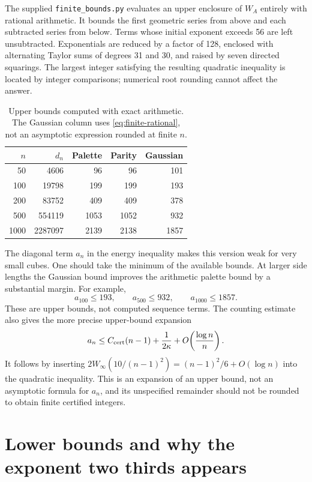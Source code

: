 \documentclass[11pt,letterpaper]{article}
\theoremstyle{definition}
\newcommand{\code}[1]{\texttt{#1}}
\begin{document}
The supplied \code{finite\_bounds.py} evaluates an upper enclosure of
\(W_A\) entirely with rational arithmetic. It bounds the first geometric
series from above and each subtracted series from below. Terms whose
initial exponent exceeds 56 are left unsubtracted. Exponentials are
reduced by a factor of 128, enclosed with alternating Taylor sums of
degrees 31 and 30, and raised by seven directed squarings. The largest
integer satisfying the resulting quadratic inequality is located by
integer comparisons; numerical root rounding cannot affect the answer.

\begin{table}[ht]
\centering
\caption{Upper bounds computed with exact arithmetic. The Gaussian column
uses \cref{eq:finite-rational}, not an asymptotic expression rounded at
finite \(n\).}
\label{tab:large-upper}
\begin{tabular}{rrrrr}
\toprule
\(n\)&\(d_n\)&Palette&Parity&Gaussian\\
\midrule
50&4606&96&96&101\\
100&19798&199&199&193\\
200&83752&409&409&378\\
500&554119&1053&1052&932\\
1000&2287097&2139&2138&1857\\
\bottomrule
\end{tabular}
\end{table}

The diagonal term \(a_n\) in the energy inequality makes this version
weak for very small cubes. One should take the minimum of the available
bounds. At larger side lengths the Gaussian bound improves the
arithmetic palette bound by a substantial margin. For example,
\[
 a_{100}\le193,\qquad a_{500}\le932,\qquad a_{1000}\le1857.
\]
These are upper bounds, not computed sequence terms.
The counting estimate also gives the more precise upper-bound
expansion
\[
 a_n\le C_{\rm cert}(n-1)+\frac1{2\kappa}
       +O\!\left(\frac{\log n}{n}\right).
\]
It follows by inserting
\(2W_\infty(10/(n-1)^2)=(n-1)^2/6+O(\log n)\) into the quadratic
inequality. This is an expansion of an upper bound, not an asymptotic
formula for \(a_n\), and its unspecified remainder should not be
rounded to obtain finite certified integers.

\section{Lower bounds and why the exponent two thirds appears}
\label{sec:lower}
\end{document}
